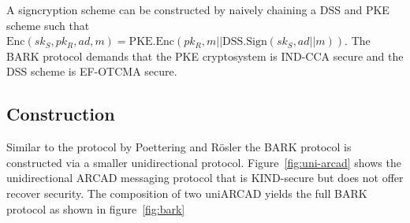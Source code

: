 \documentclass[11pt,a4paper,twoside,openright,bibliography=totoc]{scrbook}
\renewcommand{\t}{\text} %
\begin{document}
A signcryption scheme can be constructed by naively chaining a DSS and PKE scheme
such that $\t{Enc}(sk_S,pk_R,ad,m) = \t{PKE.Enc}(pk_R,m || \t{DSS.Sign}(sk_S,ad || m))$.
The BARK protocol demands that the PKE cryptosystem is IND-CCA secure and the
DSS scheme is EF-OTCMA secure.

\subsection{Construction}
\label{sec:construction-2}

Similar to the protocol by Poettering and Rösler the BARK protocol is
constructed via a smaller unidirectional protocol. Figure~\ref{fig:uni-arcad}
shows the unidirectional ARCAD messaging protocol that is KIND-secure but
does not offer recover security. The composition of two uniARCAD yields
the full BARK protocol as shown in figure~\ref{fig:bark}
\end{document}
